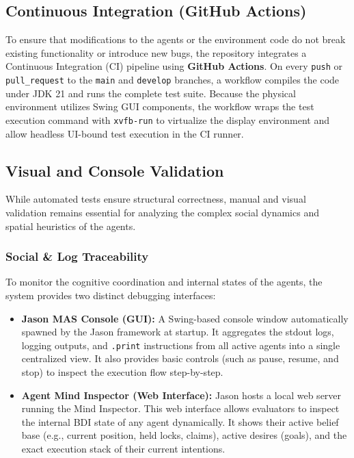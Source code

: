 \documentclass{scrartcl}
\begin{document}
\subsection{Continuous Integration (GitHub Actions)}

To ensure that modifications to the agents or the environment code do not break existing functionality or introduce new bugs, the repository integrates a Continuous Integration (CI) pipeline using \textbf{GitHub Actions}. On every \texttt{push} or \texttt{pull\_request} to the \texttt{main} and \texttt{develop} branches, a workflow compiles the code under JDK 21 and runs the complete test suite. Because the physical environment utilizes Swing GUI components, the workflow wraps the test execution command with \texttt{xvfb-run} to virtualize the display environment and allow headless UI-bound test execution in the CI runner.


\subsection{Visual and Console Validation}

While automated tests ensure structural correctness, manual and visual validation remains essential for analyzing the complex social dynamics and spatial heuristics of the agents.

\subsubsection{Social \& Log Traceability}

To monitor the cognitive coordination and internal states of the agents, the system provides two distinct debugging interfaces:

\begin{itemize}
\item \textbf{Jason MAS Console (GUI):} A Swing-based console window automatically spawned by the Jason framework at startup. It aggregates the stdout logs, logging outputs, and \texttt{.print} instructions from all active agents into a single centralized view. It also provides basic controls (such as pause, resume, and stop) to inspect the execution flow step-by-step.
\item \textbf{Agent Mind Inspector (Web Interface):} Jason hosts a local web server running the Mind Inspector. This web interface allows evaluators to inspect the internal BDI state of any agent dynamically. It shows their active belief base (e.g., current position, held locks, claims), active desires (goals), and the exact execution stack of their current intentions.
\end{itemize}
\end{document}
